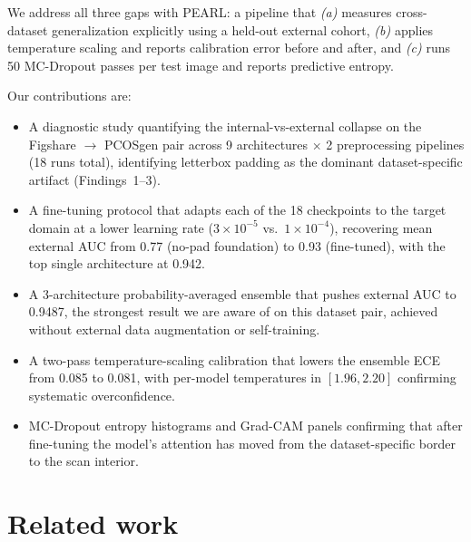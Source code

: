 \documentclass[11pt,twocolumn]{article}
\newcommand{\PCOS}{PCOS}
\newcommand{\PEARL}{PEARL}
\newcommand{\ECE}{ECE}
\newcommand{\AUC}{AUC}
\newcommand{\GradCAM}{Grad-CAM}
\begin{document}
We address all three gaps with \PEARL{}: a pipeline that
\textit{(a)} measures cross-dataset generalization explicitly using a
held-out external cohort, \textit{(b)} applies temperature scaling and
reports calibration error before and after, and \textit{(c)} runs 50
MC-Dropout passes per test image and reports predictive entropy.

Our contributions are:
\begin{itemize}[leftmargin=*,noitemsep,topsep=2pt]
  \item A diagnostic study quantifying the internal-vs-external collapse
        on the Figshare $\rightarrow$ \PCOS{}gen pair across 9
        architectures $\times$ 2 preprocessing pipelines (18 runs total),
        identifying letterbox padding as the dominant dataset-specific
        artifact (Findings~1--3).
  \item A fine-tuning protocol that adapts each of the 18 checkpoints to
        the target domain at a lower learning rate ($3{\times}10^{-5}$
        vs.\ $1{\times}10^{-4}$), recovering mean external \AUC{} from
        0.77 (no-pad foundation) to 0.93 (fine-tuned), with the top single
        architecture at 0.942.
  \item A 3-architecture probability-averaged ensemble that pushes
        external \AUC{} to 0.9487, the strongest result we are aware of on
        this dataset pair, achieved without external data augmentation or
        self-training.
  \item A two-pass temperature-scaling calibration that lowers the
        ensemble \ECE{} from 0.085 to 0.081, with per-model temperatures
        in $[1.96, 2.20]$ confirming systematic overconfidence.
  \item MC-Dropout entropy histograms and \GradCAM{} panels confirming
        that after fine-tuning the model's attention has moved from the
        dataset-specific border to the scan interior.
\end{itemize}

\section{Related work}
\end{document}
